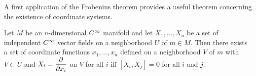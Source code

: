 \documentclass[../main]{subfiles}
\begin{document}
A first application of the Frobenius theorem provides a useful theorem concerning the existence of coordinate systems.

\begin{theorem}\label{thm:ch09.1.4}
Let $M$ be an $n$-dimensional $C^\infty$ manifold and let $X_{1}, \ldots, X_{n}$ be a set of independent $C^\infty$ vector fields on a neighborhood $U$ of $m\in M$. Then there exists a set of coordinate functions $x_{1}, \ldots, x_{n}$ defined on a neighborhood $V$ of $m$ with $V \subset U$ and $X_{i}=\dfrac{\partial }{\partial x_i}$ on $V$ for all $i$ iff $[X_{i}, X_{j}]=0$ for all $i$ and $j$.
\end{theorem} 
\end{document}
